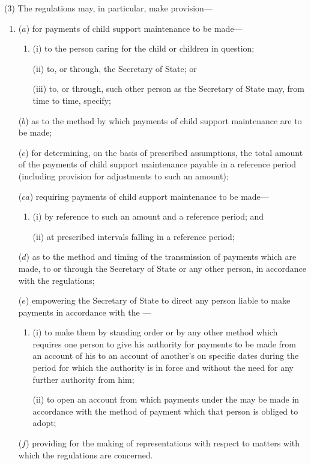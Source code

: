\documentclass[a4paper]{article}
\begin{document}
(3) The regulations may, in particular, make provision---
\begin{enumerate}\item[]
($a$) for payments of child support maintenance to be made---
\begin{enumerate}\item[]
(i) to the person caring for the child or children in question;

(ii) to, or through, the Secretary of State; or

(iii) to, or through, such other person as the Secretary of State may, from
time to time, specify;
\end{enumerate}

($b$) as to the method by which payments of child support maintenance are to
be made;

($c$) for determining, on the basis of prescribed assumptions, the total amount of the payments of child support maintenance payable in a reference period (including provision for adjustments to such an amount);

($ca$) requiring payments of child support maintenance to be made—
\begin{enumerate}\item[]
(i) by reference to such an amount and a reference period; and

(ii) at prescribed intervals falling in a reference period;
\end{enumerate}

($d$) as to the method and timing of the transmission of payments which are
made, to or through the Secretary of State or any other person, in accordance
with the regulations;

($e$) empowering the Secretary of State to direct any person liable to make
payments in accordance with the ---
\begin{enumerate}\item[]
(i) to make them by standing order or by any other method which
requires one person to give his authority for payments to be made
from an account of his to an account of another’s on specific dates
during the period for which the authority is in force and without the
need for any further authority from him;

(ii) to open an account from which payments under the  may be made in accordance with the method of payment
which that person is obliged to adopt;
\end{enumerate}

($f$) providing for the making of representations with respect to matters with
which the regulations are concerned.
\end{enumerate}
\end{document}
